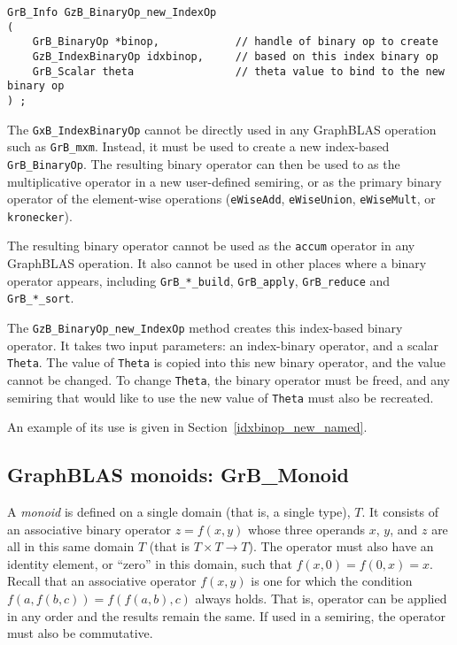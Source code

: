 \documentclass[12pt]{article}
\begin{document}
\begin{mdframed}[userdefinedwidth=6in]
{\footnotesize
\begin{verbatim}
GrB_Info GzB_BinaryOp_new_IndexOp
(
    GrB_BinaryOp *binop,            // handle of binary op to create
    GzB_IndexBinaryOp idxbinop,     // based on this index binary op
    GrB_Scalar theta                // theta value to bind to the new binary op
) ;
\end{verbatim}
}\end{mdframed}

The \verb'GxB_IndexBinaryOp' cannot be directly used in any GraphBLAS operation
such as \verb'GrB_mxm'.  Instead, it must be used to create a new index-based
\verb'GrB_BinaryOp'.  The resulting binary operator can then be used to as the
multiplicative operator in a new user-defined semiring, or as the primary
binary operator of the element-wise operations (\verb'eWiseAdd',
\verb'eWiseUnion', \verb'eWiseMult', or \verb'kronecker').

The resulting binary operator cannot be used as the \verb'accum' operator in
any GraphBLAS operation.  It also cannot be used in other places where a binary
operator appears, including \verb'GrB_*_build', \verb'GrB_apply',
\verb'GrB_reduce' and \verb'GrB_*_sort'.

The \verb'GzB_BinaryOp_new_IndexOp' method creates this index-based binary
operator.  It takes two input parameters:  an index-binary operator, and a
scalar \verb'Theta'.  The value of \verb'Theta' is copied into this new binary
operator, and the value cannot be changed.  To change \verb'Theta', the binary
operator must be freed, and any semiring that would like to use the new value
of \verb'Theta' must also be recreated.

An example of its use is given in Section~\ref{idxbinop_new_named}.

\newpage
\subsection{GraphBLAS monoids: {\sf GrB\_Monoid}} %
\label{monoid}

A {\em monoid} is defined on a single domain (that is, a single type), $T$.  It
consists of an associative binary operator $z=f(x,y)$ whose three operands $x$,
$y$, and $z$ are all in this same domain $T$ (that is $T \times T \rightarrow
T$).  The operator must also have an identity element, or ``zero'' in this
domain, such that $f(x,0)=f(0,x)=x$.  Recall that an associative operator
$f(x,y)$ is one for which the condition $f(a, f(b,c)) = f(f (a,b),c)$ always
holds.  That is, operator can be applied in any order and the results remain
the same.  If used in a semiring, the operator must also be commutative.
\end{document}
